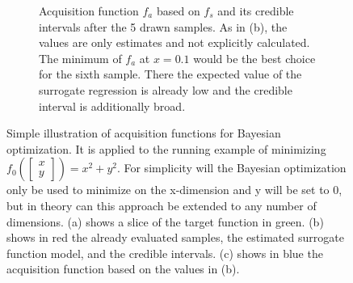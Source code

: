 \begin{figure}[ht!]
\begin{subfigure}{\textwidth}
        \caption[.]{
            Acquisition function $f_a$ based on $f_s$ and its credible intervals after the 5 drawn samples.
            As in (b), the values are only estimates and not explicitly calculated.
            The minimum of $f_a$ at $x=0.1$ would be the best choice for the sixth sample.
            There the expected value of the surrogate regression is already low and the credible interval is additionally broad.
        }
    \end{subfigure}
    \caption[Simple illustration of acquisition functions for Bayesian optimization.]{Simple illustration of acquisition functions for Bayesian optimization.
        It is applied to the running example of minimizing \ensuremath{f_0 \left( \begin{bmatrix}x\\y \end{bmatrix} \right) = x^2 + y^2}.
        For simplicity will the Bayesian optimization only be used to minimize on the x-dimension and y will be set to 0, but in theory can this approach be extended to any number of dimensions.
        (a) shows a slice of the target function in green.
        (b) shows in red the already evaluated samples, the estimated surrogate function model, and the credible intervals.
        (c) shows in blue the acquisition function based on the values in (b).
    }
    \label{fig:theory:acquisition-function}
\end{figure}

